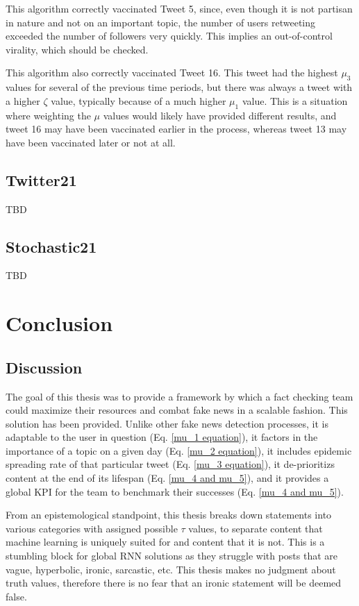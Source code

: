 \documentclass[preprint,review,12pt]{elsarticle}
\begin{document}
This algorithm correctly vaccinated Tweet 5, since, even though it is not partisan in nature and not on an important topic, the number of users retweeting exceeded the number of followers very quickly. This implies an out-of-control virality, which should be checked.

This algorithm also correctly vaccinated Tweet 16. This tweet had the highest $\mu_3$ values for several of the previous time periods, but there was always a tweet with a higher $\zeta$ value, typically because of a much higher $\mu_1$ value. This is a situation where weighting the $\mu$ values would likely have provided different results, and tweet 16 may have been vaccinated earlier in the process, whereas tweet 13 may have been vaccinated later or not at all. 



\subsection{Twitter21}
TBD
\subsection{Stochastic21}
TBD

\section{Conclusion}
\subsection{Discussion}
The goal of this thesis was to provide a framework by which a fact checking team could maximize their resources and combat fake news in a scalable fashion. This solution has been provided. Unlike other fake news detection processes, it is adaptable to the user in question (Eq. \ref{mu_1 equation}), it factors in the importance of a topic on a given day (Eq. \ref{mu_2 equation}), it includes epidemic spreading rate of that particular tweet (Eq. \ref{mu_3 equation}), it de-prioritizs content at the end of its lifespan (Eq. \ref{mu_4 and mu_5}), and it provides a global KPI for the team to benchmark their successes (Eq. \ref{mu_4 and mu_5}).

From an epistemological standpoint, this thesis breaks down statements into various categories with assigned possible $\tau$ values, to separate content that machine learning is uniquely suited for and content that it is not. This is a stumbling block for global RNN solutions as they struggle with posts that are vague, hyperbolic, ironic, sarcastic, etc. This thesis makes no judgment about truth values, therefore there is no fear that an ironic statement will be deemed false. 
\end{document}
